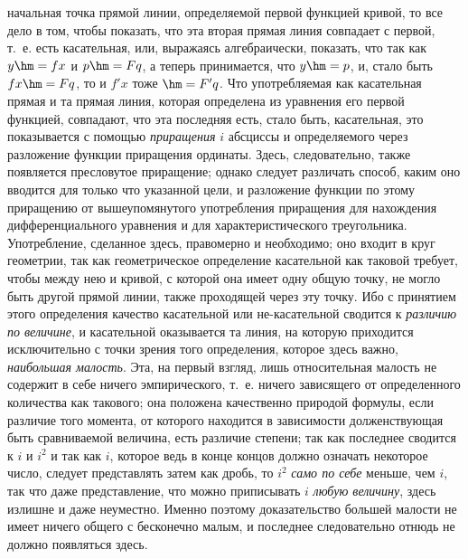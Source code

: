начальная точка прямой линии, определяемой первой функцией кривой, то все дело
в том, чтобы показать, что эта вторая прямая линия совпадает с первой, т.~е.
есть касательная, или, выражаясь алгебраически, показать, что так как $y\hm=fx$
и $p\hm=Fq$, а теперь принимается, что $y\hm=p$, и, стало быть $fx\hm=Fq$, то и
$f'x$ тоже $\hm=F'q$. Что употребляемая как касательная прямая и та прямая
линия, которая определена из уравнения его первой функцией, совпадают, что эта
последняя есть, стало быть, касательная, это показывается с помощью
{\em приращения} $i$ абсциссы и определяемого через разложение функции
приращения ординаты. Здесь, следовательно, также появляется пресловутое
приращение; однако следует различать способ, каким оно вводится для только что
указанной цели, и разложение функции по этому приращению от вышеупомянутого
употребления приращения для нахождения дифференциального уравнения и для
характеристического треугольника. Употребление, сделанное здесь, правомерно и
необходимо; оно входит в круг геометрии, так как геометрическое определение
касательной как таковой требует, чтобы между нею и кривой, с которой она имеет
одну общую точку, не могло быть другой прямой линии, также проходящей через эту
точку. Ибо с принятием этого определения качество касательной или
не-касательной сводится к {\em различию по величине}, и касательной оказывается
та линия, на которую приходится исключительно с точки зрения того определения,
которое здесь важно, {\em наибольшая малость}. Эта, на первый взгляд, лишь
относительная малость не содержит в себе ничего эмпирического, т.~е. ничего
зависящего от определенного количества как такового; она положена качественно
природой формулы, если различие того момента, от которого находится в
зависимости долженствующая быть сравниваемой величина, есть различие степени;
так как последнее сводится к $i$ и $i^{2}$ и так как $i$, которое ведь в конце
концов должно означать некоторое число, следует представлять затем как дробь,
то $i^2$ {\em само по себе} меньше, чем $i$, так что даже представление, что
можно приписывать $i$ {\em любую величину}, здесь излишне и даже неуместно.
Именно поэтому доказательство большей малости не имеет ничего общего с
бесконечно малым, и последнее следовательно отнюдь не должно появляться здесь.

